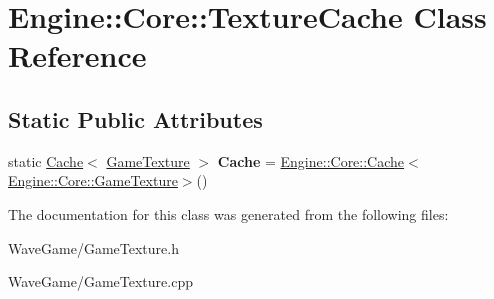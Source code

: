 \hypertarget{class_engine_1_1_core_1_1_texture_cache}{}\section{Engine\+:\+:Core\+:\+:Texture\+Cache Class Reference}
\label{class_engine_1_1_core_1_1_texture_cache}
\subsection*{Static Public Attributes}
\begin{DoxyCompactItemize}
\item 
\mbox{\label{class_engine_1_1_core_1_1_texture_cache_aaf8f2890aeb5dcb04dd3727a287965c9}} 
static \hyperlink{class_engine_1_1_core_1_1_cache}{Cache}$<$ \hyperlink{class_engine_1_1_core_1_1_game_texture}{Game\+Texture} $>$ {\bfseries Cache} = \hyperlink{class_engine_1_1_core_1_1_cache}{Engine\+::\+Core\+::\+Cache}$<$\hyperlink{class_engine_1_1_core_1_1_game_texture}{Engine\+::\+Core\+::\+Game\+Texture}$>$()
\end{DoxyCompactItemize}


The documentation for this class was generated from the following files\+:\begin{DoxyCompactItemize}
\item 
Wave\+Game/Game\+Texture.\+h\item 
Wave\+Game/Game\+Texture.\+cpp\end{DoxyCompactItemize}
